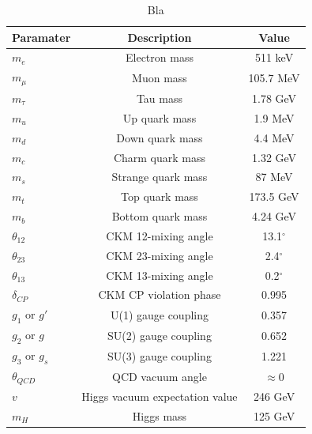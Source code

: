 \begin{table}[]
\centering
\begin{tabular}{|l|c|c|}
\hline
\rowcolor[HTML]{9B9B9B} 
Paramater      & Description                    & Value        \\ \hline \hline
$m_e$          & Electron mass                  & 511 keV      \\ \hline
$m_\mu$        & Muon mass                      & 105.7 MeV    \\ \hline
$m_\tau$       & Tau mass                       & 1.78 GeV     \\ \hline
$m_u$          & Up quark mass                  & 1.9 MeV      \\ \hline
$m_d$          & Down quark mass                & 4.4 MeV      \\ \hline
$m_c$          & Charm quark mass               & 1.32 GeV     \\ \hline
$m_s$          & Strange quark mass             & 87 MeV       \\ \hline
$m_t$          & Top quark mass                 & 173.5 GeV    \\ \hline
$m_b$          & Bottom quark mass              & 4.24 GeV     \\ \hline
$\theta_{12}$  & CKM 12-mixing angle            & 13.1$^\circ$ \\ \hline
$\theta_{23}$  & CKM 23-mixing angle            & 2.4$^\circ$  \\ \hline
$\theta_{13}$  & CKM 13-mixing angle            & 0.2$^\circ$  \\ \hline
$\delta_{CP}$  & CKM CP violation phase         & 0.995        \\ \hline
$g_1$ or $g'$  & U(1) gauge coupling            & 0.357        \\ \hline
$g_2$ or $g$   & SU(2) gauge coupling           & 0.652        \\ \hline
$g_3$ or $g_s$ & SU(3) gauge coupling           & 1.221        \\ \hline
$\theta_{QCD}$ & QCD vacuum angle               & $\approx 0$  \\ \hline
$v$            & Higgs vacuum expectation value & 246 GeV      \\ \hline
$m_H$          & Higgs mass                     & 125 GeV      \\ \hline
\end{tabular}
\caption{Bla}
\label{tab:freeparameters}
\end{table}
